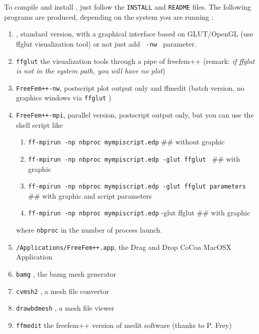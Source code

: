\documentclass[a4paper,twoside,12pt]{book}
\begin{document}
To compile and install \freefempp, just follow the \texttt{INSTALL}
and \texttt{README} files. The following programs are produced,
depending on the system you are running :
\begin{enumerate}
\item \freefempp, standard version, with a graphical interface
based on GLUT/OpenGL (use ffglut visualization tool) or not just add \texttt{ -nw } parameter.
\item \texttt{ffglut} the visualization tools  through a pipe of freefem++ (remark: {\it if ffglut is not in the system path,
you will have no plot})
\item \texttt{FreeFem++-nw}, postscript plot output only and  ffmedit (batch version, no graphics windows via \texttt{ffglut} )
\item \texttt{FreeFem++-mpi}, parallel version, postscript output only, but you can use the shell script like  
\begin{enumerate}
 \item \texttt{ff-mpirun -np nbproc mympiscript.edp}  \#\# without graphic 
  \item \texttt{ff-mpirun -np nbproc mympiscript.edp -glut ffglut }  \#\# with graphic
  \item \texttt{ff-mpirun -np nbproc mympiscript.edp -glut ffglut  parameters }   \#\# with graphic and script parameters
  \item \texttt{ff-mpirun -np nbproc mympiscript.edp} -glut ffglut    \#\# with graphic
\end{enumerate}
  where \texttt{nbproc} in the number of process launch. 
\item \texttt{/Applications/FreeFem++.app}, the Drag and Drop CoCoa MacOSX
Application
\item \texttt{bamg} , the bamg mesh generator
\item \texttt{cvmsh2} , a mesh file convertor
\item \texttt{drawbdmesh} , a mesh file viewer
\item \texttt{ffmedit} the freefem++ version of medit software (thanks to P. Frey)
\end{enumerate}
\end{document}
